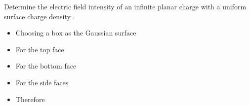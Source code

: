 
\begin{ELexample}{}

Determine the electric field intensity of an infinite planar charge with a uniform surface charge density .


\begin{ELsolution}


\begin{itemize}
\tightlist
\item
  Choosing a box as the Gaussian surface
\item
  For the top face
\end{itemize}


\begin{itemize}
\tightlist
\item
  For the bottom face
\end{itemize}


\begin{itemize}
\tightlist
\item
  For the side faces
\end{itemize}


\begin{itemize}
\tightlist
\item
  Therefore
\end{itemize}


\begin{ELimportant}{}


\end{ELimportant}

\end{ELsolution}

\end{ELexample}

